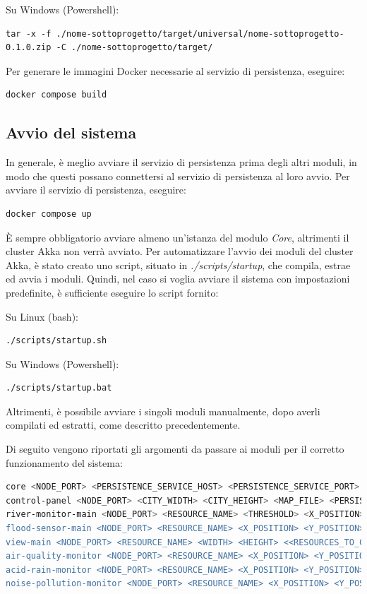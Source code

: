 \documentclass{scrartcl}
\begin{document}
Su Windows (Powershell):
\begin{lstlisting}
tar -x -f ./nome-sottoprogetto/target/universal/nome-sottoprogetto-0.1.0.zip -C ./nome-sottoprogetto/target/
\end{lstlisting}

Per generare le immagini Docker necessarie al servizio di persistenza, eseguire:

\begin{lstlisting}[language=bash]
    docker compose build
\end{lstlisting}

\subsection{Avvio del sistema}

In generale, è meglio avviare il servizio di persistenza prima degli altri moduli, in modo che questi possano connettersi al servizio di persistenza al loro avvio. Per avviare il servizio di persistenza, eseguire:

\begin{lstlisting}[language=bash]
docker compose up
\end{lstlisting}

È sempre obbligatorio avviare almeno un'istanza del modulo \textit{Core}, altrimenti il cluster Akka non verrà avviato.
Per automatizzare l'avvio dei moduli del cluster Akka, è stato creato uno script, situato in \textit{./scripts/startup}, che compila, estrae ed avvia i moduli. Quindi, nel caso si voglia avviare il sistema con impostazioni predefinite, è sufficiente eseguire lo script fornito:

Su Linux (bash):

\begin{lstlisting}[language=bash]
./scripts/startup.sh
\end{lstlisting}

Su Windows (Powershell):

\begin{lstlisting}[language=bash]
./scripts/startup.bat
\end{lstlisting}

Altrimenti, è possibile avviare i singoli moduli manualmente, dopo averli compilati ed estratti, come descritto precedentemente.

Di seguito vengono riportati gli argomenti da passare ai moduli per il corretto funzionamento del sistema:
\begin{lstlisting}[language=bash]
core <NODE_PORT> <PERSISTENCE_SERVICE_HOST> <PERSISTENCE_SERVICE_PORT>
control-panel <NODE_PORT> <CITY_WIDTH> <CITY_HEIGHT> <MAP_FILE> <PERSISTENCE_SERVICE_HOST> <PERSISTENCE_SERVICE_PORT>
river-monitor-main <NODE_PORT> <RESOURCE_NAME> <THRESHOLD> <X_POSITION> <Y_POSITION> <<RESOURCES_TO_CHECK>...>
flood-sensor-main <NODE_PORT> <RESOURCE_NAME> <X_POSITION> <Y_POSITION>
view-main <NODE_PORT> <RESOURCE_NAME> <WIDTH> <HEIGHT> <<RESOURCES_TO_CHECK>...>
air-quality-monitor <NODE_PORT> <RESOURCE_NAME> <X_POSITION> <Y_POSITION> <SENSOR_URI>
acid-rain-monitor <NODE_PORT> <RESOURCE_NAME> <X_POSITION> <Y_POSITION>
noise-pollution-monitor <NODE_PORT> <RESOURCE_NAME> <X_POSITION> <Y_POSITION>
\end{lstlisting}
\end{document}
